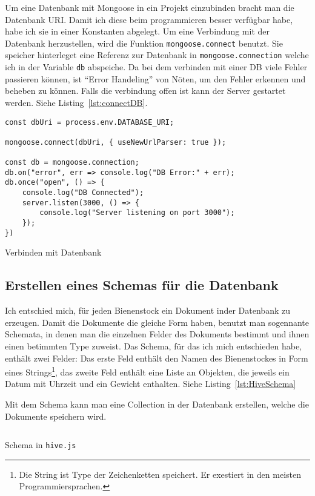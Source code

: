 \documentclass[a4paper, ngerman, 11pt]{scrartcl}
\newcommand{\js}[1]{\texttt{#1}}
\begin{document}
Um eine Datenbank mit Mongoose in ein Projekt einzubinden bracht man die Datenbank URI.
Damit ich diese beim programmieren besser verfügbar habe, habe ich sie in einer Konstanten abgelegt.
Um eine Verbindung mit der Datenbank herzustellen, wird die Funktion \js{mongoose.connect} benutzt.
Sie speicher hinterleget eine Referenz zur Datenbank in \js{mongoose.connection} welche ich in der Variable \js{db} abspeiche.
Da bei dem verbinden mit einer DB viele Fehler passieren können, ist \enquote{Error Handeling} von Nöten, um den Fehler erkennen und beheben zu können.
Falls die verbindung offen ist kann der Server gestartet werden. Siehe Listing~\ref{lst:connectDB}.
\begin{listing}[ht]
\centering
\begin{verbatim}
const dbUri = process.env.DATABASE_URI;

mongoose.connect(dbUri, { useNewUrlParser: true });

const db = mongoose.connection;
db.on("error", err => console.log("DB Error:" + err);
db.once("open", () => {
    console.log("DB Connected");
    server.listen(3000, () => {
        console.log("Server listening on port 3000");
    });
})
\end{verbatim}
\caption{Verbinden mit Datenbank\label{lst:connectDB}}
\end{listing}


\subsection{Erstellen eines Schemas für die Datenbank} %

Ich entschied mich, für jeden Bienenstock ein Dokument inder Datenbank zu erzeugen. Damit die Dokumente die gleiche Form haben, benutzt man sogennante Schemata, in denen man die einzelnen Felder des Dokuments bestimmt und ihnen einen betimmten Type zuweist. Das Schema, für das ich mich entschieden habe, enthält zwei Felder: Das erste Feld enthält den Namen des Bienenstockes in Form eines Strings\footnote{Die String ist Type der Zeichenketten speichert. Er exestiert in den meisten Programmiersprachen.}, das zweite Feld enthält eine Liste an Objekten, die jeweils ein Datum mit Uhrzeit und ein Gewicht enthalten. Siehe Listing~\ref{lst:HiveSchema}

Mit dem Schema kann man eine Collection in der Datenbank erstellen, welche die Dokumente speichern wird.

\begin{listing}[ht]
\inputminted{javascript}{../models/hive.js}
\caption{Schema in \texttt{hive.js}}\label{lst:HiveSchema}
\end{listing}
\end{document}
